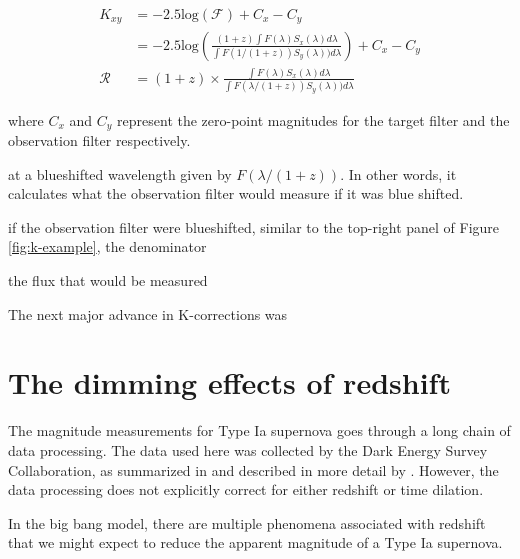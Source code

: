 \documentclass{article}
\begin{document}
\begin{equation}
\begin{aligned}
\label{eq:kim_flux}
  K_{xy} &= -2.5 \text{log}(\mathcal{F}) + C_x - C_y \\
         &= -2.5 \text{log}\left(
              \frac{(1+z) \int F(\lambda)S_x(\lambda)d\lambda}
                   {\int F(1/(1+z))S_y(\lambda))d\lambda}\right) + C_x - C_y \\
  \mathcal{R} &= (1+z) \times \frac{\int F(\lambda)S_x(\lambda)d\lambda}
                                   {\int F(\lambda/(1+z))S_y(\lambda))d\lambda}
\end{aligned}
\end{equation}

where $C_x$ and $C_y$ represent the zero-point magnitudes for the target filter
and the observation filter respectively.



at a
blueshifted wavelength given by $F(\lambda / (1+z))$. In other words, it calculates what the observation filter would measure if it was blue shifted.

if the observation filter were blueshifted, similar to the top-right panel of Figure \ref{fig:k-example}, the denominator

the flux that would be measured 


The next major advance in K-corrections was

\citet{snpy}

\begin{minipage}[c]{0.95\textwidth}

\end{minipage}

\section{The dimming effects of redshift}
\label{sec:redshift}

The magnitude measurements for Type Ia supernova goes through a long chain of
data processing. The data used here was collected by the Dark Energy Survey
Collaboration, as summarized in \citet{abbott2024} and described in more detail
by \citet{vincenzi2024}. However, the data processing does not explicitly
correct for either redshift or time dilation.

In the big bang model, there are multiple phenomena associated with redshift that we
might expect to reduce the apparent magnitude of a Type Ia supernova.
\end{document}
